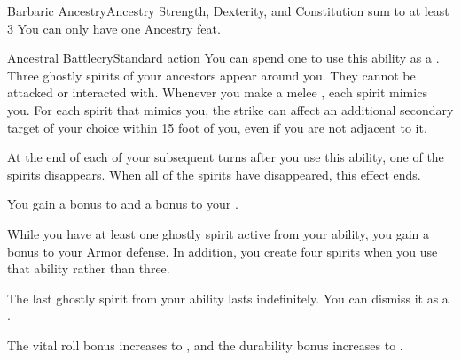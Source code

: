   \begin{feat}{Barbaric Ancestry}{Ancestry}
    \featpre Strength, Dexterity, and Constitution sum to at least 3
     You can only have one Ancestry feat.

    \begin{magicalactiveability}{Ancestral Battlecry}{Standard action}
      \abilitycost You can spend one  to use this ability as a .
      \rankline
      Three ghostly spirits of your ancestors appear around you.
      They cannot be attacked or interacted with.
      Whenever you make a melee , each spirit mimics you.
      For each spirit that mimics you, the strike can affect an additional secondary target of your choice within 15 foot  of you, even if you are not adjacent to it.

      At the end of each of your subsequent turns after you use this ability, one of the spirits disappears.
      When all of the spirits have disappeared, this effect ends.
    \end{magicalactiveability}

     You gain a  bonus to  and a  bonus to your .

     While you have at least one ghostly spirit active from your  ability, you gain a  bonus to your Armor defense.
    In addition, you create four spirits when you use that ability rather than three.

     The last ghostly spirit from your  ability lasts indefinitely.
    You can dismiss it as a .

     The vital roll bonus increases to , and the durability bonus increases to .
  \end{feat}

